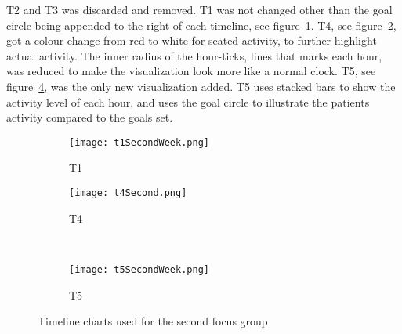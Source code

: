 T2 and T3 was discarded and removed. T1 was not changed other than the goal circle being appended to the right of each timeline, see figure~\ref{fig:t1}. T4, see figure~\ref{fig:t4}, got a colour change from red to white for seated activity, to further highlight actual activity. The inner radius of the hour-ticks, lines that marks each hour, was reduced to make the visualization look more like a normal clock. T5, see figure~\ref{fig:t5}, was the only new visualization added. T5 uses stacked bars to show the activity level of each hour, and uses the goal circle to illustrate the patients activity compared to the goals set.

\begin{figure}[h!]
  \centering
  \begin{subfigure}[b]{0.6\textwidth}
    \centering
    \texttt{[image: t1SecondWeek.png]}
    \caption{T1}
    \label{fig:t1}
  \end{subfigure}
  \begin{subfigure}[b]{0.35\textwidth}
    \centering
    \texttt{[image: t4Second.png]}
    \caption{T4}
    \label{fig:t4}
  \end{subfigure}
  \\
  \begin{subfigure}[b]{0.95\textwidth}
    \centering
    \texttt{[image: t5SecondWeek.png]}
    \caption{T5}
    \label{fig:t5}
  \end{subfigure}
  \caption{Timeline charts used for the second focus group}
\end{figure}


